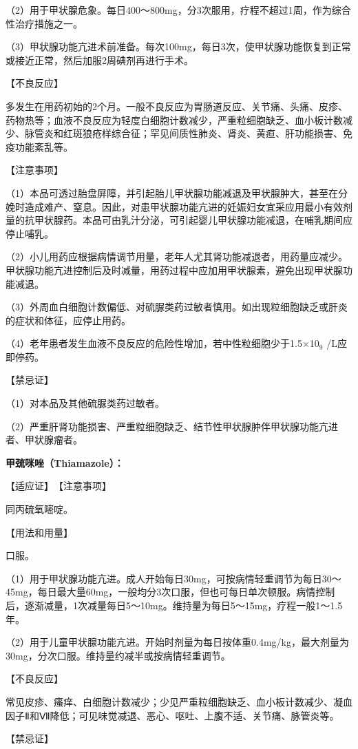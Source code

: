 （2）用于甲状腺危象。每日400～800mg，分3次服用，疗程不超过1周，作为综合性治疗措施之一。

（3）甲状腺功能亢进术前准备。每次100mg，每日3次，使甲状腺功能恢复到正常或接近正常，然后加服2周碘剂再进行手术。

【不良反应】

多发生在用药初始的2个月。一般不良反应为胃肠道反应、关节痛、头痛、皮疹、药物热等；血液不良反应为轻度白细胞计数减少，严重粒细胞缺乏、血小板计数减少、脉管炎和红斑狼疮样综合征；罕见间质性肺炎、肾炎、黄疸、肝功能损害、免疫功能紊乱等。

【注意事项】

（1）本品可透过胎盘屏障，并引起胎儿甲状腺功能减退及甲状腺肿大，甚至在分娩时造成难产、窒息。因此，对患甲状腺功能亢进的妊娠妇女宜采应用最小有效剂量的抗甲状腺药。本品可由乳汁分泌，可引起婴儿甲状腺功能减退，在哺乳期间应停止哺乳。

（2）小儿用药应根据病情调节用量，老年人尤其肾功能减退者，用药量应减少。甲状腺功能亢进控制后及时减量，用药过程中应加用甲状腺素，避免出现甲状腺功能减退。

（3）外周血白细胞计数偏低、对硫脲类药过敏者慎用。如出现粒细胞缺乏或肝炎的症状和体征，应停止用药。

（4）老年患者发生血液不良反应的危险性增加，若中性粒细胞少于1.5×10$_{9}$
/L应即停药。

【禁忌证】

（1）对本品及其他硫脲类药过敏者。

（2）严重肝肾功能损害、严重粒细胞缺乏、结节性甲状腺肿伴甲状腺功能亢进者、甲状腺瘤者。

\textbf{甲巯咪唑（Thiamazole）：}

【适应证】　【注意事项】

同丙硫氧嘧啶。

【用法和用量】

口服。

（1）用于甲状腺功能亢进。成人开始每日30mg，可按病情轻重调节为每日30～45mg，每日最大量60mg，一般均分3次口服，但也可每日单次顿服。病情控制后，逐渐减量，1次减量每日5～10mg。维持量为每日5～15mg，疗程一般1～1.5年。

（2）用于儿童甲状腺功能亢进。开始时剂量为每日按体重0.4mg/kg，最大剂量为30mg，分次口服。维持量约减半或按病情轻重调节。

【不良反应】

常见皮疹、瘙痒、白细胞计数减少；少见严重粒细胞缺乏、血小板计数减少、凝血因子Ⅱ和Ⅶ降低；可见味觉减退、恶心、呕吐、上腹不适、关节痛、脉管炎等。

【禁忌证】

